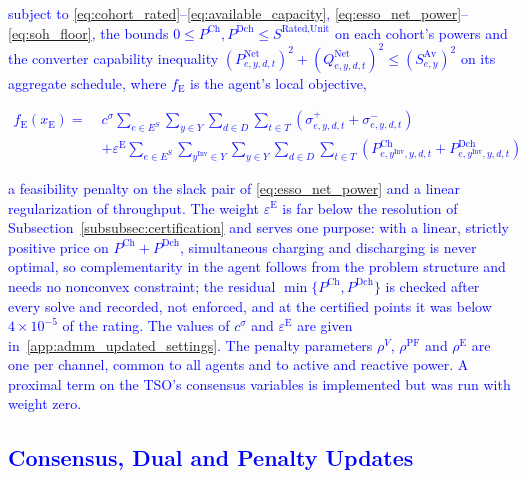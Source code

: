 \documentclass[preprint,12pt]{elsarticle}
\begin{document}
\noindent
\textcolor{blue}{
    subject to \eqref{eq:cohort_rated}--\eqref{eq:available_capacity}, \eqref{eq:esso_net_power}--\eqref{eq:soh_floor}, the bounds $0 \le P^{\text{Ch}}, P^{\text{Dch}} \le S^{\text{Rated,Unit}}$ on each cohort's powers and the converter capability inequality $(P^{\text{Net}}_{e,y,d,t})^2 + (Q^{\text{Net}}_{e,y,d,t})^2 \le (S^{\text{Av}}_{e,y})^2$ on its aggregate schedule, where $f_{\text{E}}$ is the agent's local objective,
}

\textcolor{blue}{
    \begin{equation}
        \begin{aligned}
            f_{\text{E}}(x_{\text{E}}) = \;
            & c^{\sigma} \sum_{e \in E^S} \sum_{y \in Y} \sum_{d \in D} \sum_{t \in T}
            \left( \sigma^{+}_{e,y,d,t} + \sigma^{-}_{e,y,d,t} \right)\\
            & + \varepsilon^{\text{E}} \sum_{e \in E^S} \sum_{y^\text{Inv} \in Y} \sum_{y \in Y} \sum_{d \in D} \sum_{t \in T}
            \left( P^{\text{Ch}}_{e,y^\text{Inv},y,d,t} + P^{\text{Dch}}_{e,y^\text{Inv},y,d,t} \right)
        \end{aligned}
        \label{eq:esso_objective}
    \end{equation}
}

\noindent
\textcolor{blue}{
    a feasibility penalty on the slack pair of \eqref{eq:esso_net_power} and a linear regularization of throughput. The weight $\varepsilon^{\text{E}}$ is far below the resolution of Subsection~\ref{subsubsec:certification} and serves one purpose: with a linear, strictly positive price on $P^{\text{Ch}} + P^{\text{Dch}}$, simultaneous charging and discharging is never optimal, so complementarity in the agent follows from the problem structure and needs no nonconvex constraint; the residual $\min\{P^{\text{Ch}}, P^{\text{Dch}}\}$ is checked after every solve and recorded, not enforced, and at the certified points it was below $4 \times 10^{-5}$ of the rating. 
    The values of $c^{\sigma}$ and $\varepsilon^{\text{E}}$ are given in~\ref{app:admm_updated_settings}.
    The penalty parameters $\rho^{V}$, $\rho^{\text{PF}}$ and $\rho^{\text{E}}$ are one per channel, common to all agents and to active and reactive power. A proximal term on the TSO's consensus variables is implemented but was run with weight zero.
}

\subsection{\textcolor{blue}{Consensus, Dual and Penalty Updates}}
\label{app:admm_updated_updates}
\end{document}
